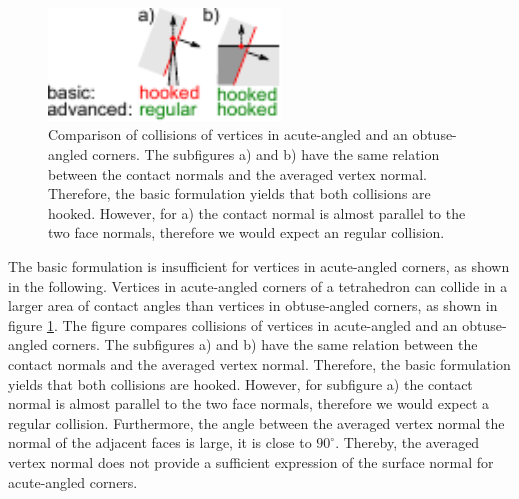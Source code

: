 \begin{figure}[tbp] 
  \centering
     \includegraphics[width=0.55\textwidth]{pics/pdf/anglesOfAttack.pdf}
  \caption[Comparison of the contact categorization with normals and normal spans.]{Comparison of collisions of vertices in acute-angled and an obtuse-angled corners. The subfigures a) and b) have the same relation between the contact normals and the averaged vertex normal. Therefore, the basic formulation yields that both collisions are hooked. However, for a) the contact normal is almost parallel to the two face normals, therefore we would expect an regular collision.}
  \label{fig::anglesOfAttack}
\end{figure}

The basic formulation is insufficient for vertices in acute-angled corners, as shown in the following.
Vertices in acute-angled corners of a tetrahedron can collide in a larger area of contact angles than vertices in obtuse-angled corners, as shown in figure \ref{fig::anglesOfAttack}.  The figure compares collisions of vertices in acute-angled and an obtuse-angled corners. The subfigures a) and b) have the same relation between the contact normals and the averaged vertex normal. Therefore, the basic formulation yields that both collisions are hooked. However, for subfigure a) the contact normal is almost parallel to the two face normals, therefore we would expect a regular collision. Furthermore, the angle between the averaged vertex normal the normal of the adjacent faces is large, it is close to $90^\circ$. Thereby, the averaged vertex normal does not provide a sufficient expression of the surface normal for acute-angled corners.


